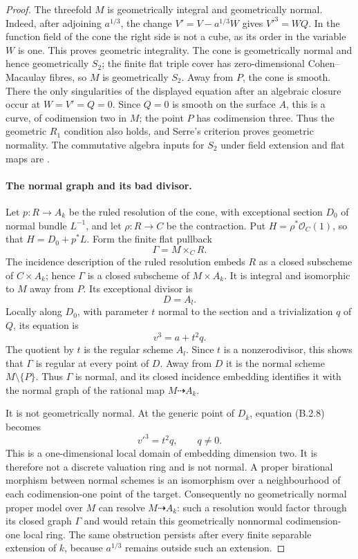 \begin{proof}
The threefold $M$ is geometrically integral and geometrically
normal.  Indeed, after adjoining $a^{1/3}$, the change
$V'=V-a^{1/3}W$ gives $V'^3=WQ$.  In the function field of the
cone the right side is not a cube, as its order in the variable
$W$ is one.  This proves geometric integrality.
The cone is geometrically normal and hence geometrically $S_2$;
the finite flat triple cover has zero-dimensional
Cohen--Macaulay fibres, so $M$ is geometrically $S_2$.
Away from $P$, the cone is smooth.  There the only singularities
of the displayed equation after an algebraic closure occur at
$W=V'=Q=0$.  Since $Q=0$ is smooth on the surface $A$, this is
a curve, of codimension two in $M$; the point $P$ has codimension
three.  Thus the geometric $R_1$ condition also holds, and
Serre's criterion proves geometric normality.  The commutative
algebra inputs for $S_2$ under field extension and flat maps are
\cite[Tags 045M, 0339 and 031S]{StacksB}.

\paragraph{The normal graph and its bad divisor.}
Let $p:R\to A_k$ be the ruled resolution of the cone, with
exceptional section $D_0$ of normal bundle $L^{-1}$, and let
$\rho:R\to C$ be the contraction.  Put
$H=\rho^*\mathcal O_C(1)$, so that $H=D_0+p^*L$.
Form the finite flat pullback
\[
                    \Gamma=M\times_C R.
\]
The incidence description of the ruled resolution embeds
$R$ as a closed subscheme of $C\times A_k$; hence $\Gamma$
is a closed subscheme of $M\times A_k$.
It is integral and isomorphic to $M$ away from $P$.
Its exceptional divisor is
\[
                       D=A_l.
\]
Locally along $D_0$, with parameter $t$ normal to the section
and a trivialization $q$ of $Q$, its equation is
\[
                         v^3=a+t^2q.                 \tag{B.2.8}
\]
The quotient by $t$ is the regular scheme $A_l$.
Since $t$ is a nonzerodivisor, this shows that $\Gamma$ is
regular at every point of $D$.  Away from $D$ it is the normal
scheme $M\setminus\{P\}$.  Thus $\Gamma$ is normal, and its
closed incidence embedding identifies it with the normal graph
of the rational map $M\dashrightarrow A_k$.

It is not geometrically normal.  At the generic point of
$D_{\bar k}$, equation (B.2.8) becomes
\[
                    v'^3=t^2q,\qquad q\ne0.
\]
This is a one-dimensional local domain of embedding dimension
two.  It is therefore not a discrete valuation ring and is not
normal.  A proper birational morphism between normal schemes is
an isomorphism over a neighbourhood of each codimension-one
point of the target.  Consequently no geometrically normal
proper model over $M$ can resolve $M\dashrightarrow A_k$:
such a resolution would factor through its closed graph
$\Gamma$ and would retain this geometrically nonnormal
codimension-one local ring.  The same obstruction persists
after every finite separable extension of $k$, because
$a^{1/3}$ remains outside such an extension.


\end{proof}
